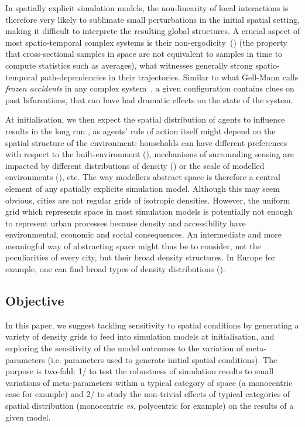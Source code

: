 \documentclass[Afour,sageh,times]{sagej}
\begin{document}
In spatially explicit simulation models, the non-linearity of local interactions is therefore very likely to sublimate small perturbations in the initial spatial setting, making it difficult to interprete the resulting global structures.  A crucial aspect of most spatio-temporal complex systems is their non-ergodicity~(\cite{pumain2012urban}) (the property that cross-sectional samples in space are not equivalent to samples in time to compute statistics such as averages), what witnesses generally strong spatio-temporal path-dependencies in their trajectories. Similar to what Gell-Mann calls \emph{frozen accidents} in any complex system~\cite{gell1995quark}, a given configuration contains clues on past bifurcations, that can have had dramatic effects on the state of the system. 


At initialisation, we then expect the spatial distribution of agents to influence results in the long run \cite{Castellanoetal2009}, as agents' rule of action itself might depend on the spatial structure of the environment: households can have different preferences with respect to the built-environment (\cite{SpielmanHarrison2014}), mechanisms of surrounding sensing are impacted by different distributions of density (\cite{Banos2012}) or the scale of modelled environments (\cite{LauriJaggi2003, FossettDietrich2009}), etc. The way modellers abstract space is therefore a central element of any spatially explicite simulation model. Although this may seem obvious, cities are not regular grids of isotropic densities. However, the uniform grid which represents space in most simulation models is potentially not enough to represent urban processes because density and accessibility have environmental, economic and social consequences. An intermediate and more meaningful way of abstracting space might thus be to consider, not the peculiarities of every city, but their broad density structures. In Europe for example, one can find broad types of density distributions (\cite{LeNechet2015}). 

\subsection{Objective}

In this paper, we suggest tackling sensitivity to spatial conditions by generating a variety of density grids to feed into simulation models at initialisation, and exploring the sensitivity of the model outcomes to the variation of meta-parameters (i.e. parameters used to generate initial spatial conditions). The purpose is two-fold: 1/ to test the robustness of simulation results to small variations of meta-parameters within a typical category of space (a monocentric case for example) and 2/ to study the non-trivial effects of typical categories of spatial distribution (monocentric \textit{vs.} polycentric for example) on the results of a given model.
\end{document}
